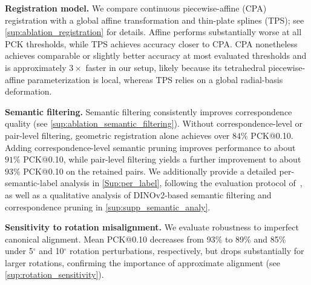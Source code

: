 \noindent\textbf{Registration model.}
We compare continuous piecewise-affine (CPA) registration with a global affine transformation and thin-plate splines (TPS); see \autoref{sup:ablation_registration} for details. Affine performs substantially worse at all PCK thresholds, while TPS achieves accuracy closer to CPA. CPA nonetheless achieves comparable or slightly better accuracy at most evaluated thresholds and is approximately \(3\times\) faster in our setup, likely because its tetrahedral piecewise-affine parameterization is local, whereas TPS relies on a global radial-basis deformation.



\par\noindent\textbf{Semantic filtering.}
Semantic filtering consistently improves correspondence quality (see \autoref{sup:ablation_semantic_filtering}). Without correspondence-level or pair-level filtering, geometric registration alone achieves over \(84\%\) PCK@0.10. Adding correspondence-level semantic pruning improves performance to about \(91\%\) PCK@0.10, while pair-level filtering yields a further improvement to about \(93\%\) PCK@0.10 on the retained pairs. We additionally provide a detailed per-semantic-label analysis in \autoref{Sup:per_label}, following the evaluation protocol of~\cite{wimmer2024back}, as well as a qualitative analysis of DINOv2-based semantic filtering and correspondence pruning in \autoref{sup:supp_semantic_analy}.


\noindent\textbf{Sensitivity to rotation misalignment.}
We evaluate robustness to imperfect canonical alignment.
Mean PCK@0.10 decreases from 93\% to 89\% and 85\%
under 5$^\circ$ and 10$^\circ$ rotation perturbations,
respectively, but drops substantially for larger rotations,
confirming the importance of approximate alignment
(see \autoref{sup:rotation_sensitivity}).
\endgroup